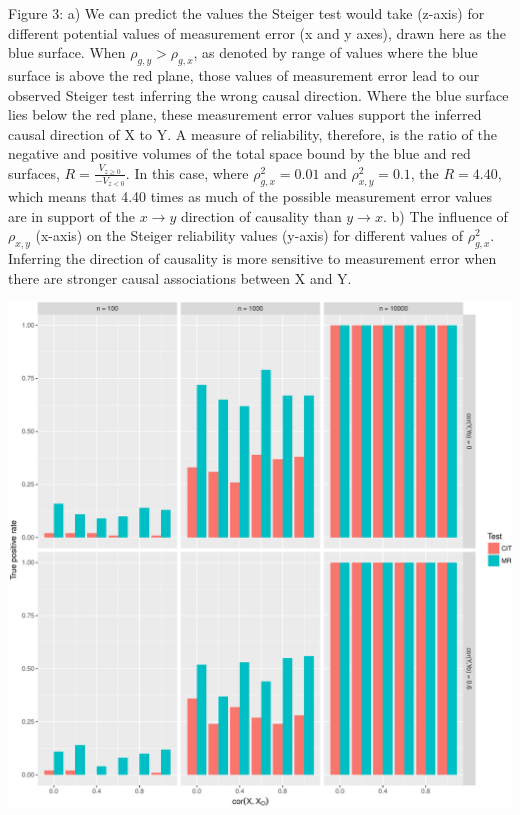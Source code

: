 \documentclass[]{article}
\begin{document}
Figure 3: a) We can predict the values the Steiger test would take
(z-axis) for different potential values of measurement error (x and y
axes), drawn here as the blue surface. When \(\rho_{g,y} > \rho_{g,x}\),
as denoted by range of values where the blue surface is above the red
plane, those values of measurement error lead to our observed Steiger
test inferring the wrong causal direction. Where the blue surface lies
below the red plane, these measurement error values support the inferred
causal direction of X to Y. A measure of reliability, therefore, is the
ratio of the negative and positive volumes of the total space bound by
the blue and red surfaces, \(R = \frac{V_{z \geq 0}}{ - V_{z < 0} }\).
In this case, where \(\rho_{g,x}^2 = 0.01\) and \(\rho_{x,y}^2 = 0.1\),
the \(R = 4.40\), which means that 4.40 times as much of the possible
measurement error values are in support of the \(x \rightarrow y\)
direction of causality than \(y \rightarrow x\). b) The influence of
\(\rho_{x,y}\) (x-axis) on the Steiger reliability values (y-axis) for
different values of \(\rho_{g,x}^2\). Inferring the direction of
causality is more sensitive to measurement error when there are stronger
causal associations between X and Y.

\newpage

\includegraphics{manuscript_files/figure-latex/causality_exists_tpr-1.pdf}
\end{document}
